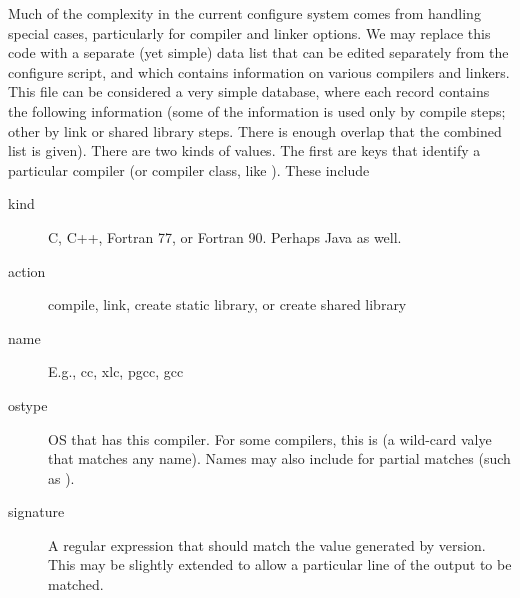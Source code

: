 \documentclass{article}
\begin{document}
Much of the complexity in the current configure system comes from
handling special cases, particularly for compiler and linker options.
We may replace this code with a separate (yet simple) data list
that can be edited separately from the configure script, and which
contains information on various compilers and linkers.
This file can be considered a very simple database, where each record
contains the following information (some of the information is used
only by compile steps; other by link or shared library steps.  There
is enough overlap that the combined list is given).
There are two kinds of values.  The first are keys that identify a particular
compiler (or compiler class, like ).  These include
\begin{description}
\item[kind]C, C++, Fortran 77, or Fortran 90.  Perhaps Java as well.
\item[action]compile, link, create static library, or create shared library
\item[name]E.g., cc, xlc, pgcc, gcc
\item[ostype]OS that has this compiler.  For some compilers, this is
  \code{*} (a wild-card valye that matches any name).  Names may also
  include \code{*} for partial matches (such as ).
\item[signature]A regular expression that should match the value
generated by version.  This may be slightly extended to allow a
particular line of the output to be matched.
\end{description}
\end{document}
